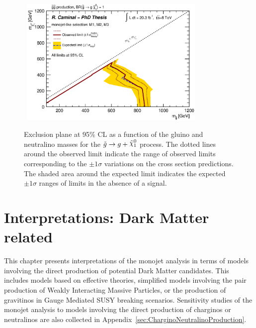 \begin{figure}[!ht]
  \begin{center}
    \mbox{
      \includegraphics[width=0.795\textwidth]{Interpretations/Figures/limitPlotGluinoGg_Stop_combined_M1_M2_M3_.eps}
    }
  \end{center}
  \caption[Exclusion plane at 95\% CL for gluino pair production with $\gluinotog$ as a function of the $m_{\gluino}$ and $m_{\ninoone}$]{Exclusion plane at 95\% CL as a function of the gluino and neutralino masses for the $\gluinotog$ process. The dotted lines around the observed limit indicate the range of observed limits corresponding to the $\pm 1 \sigma$ variations on the cross section predictions. The shaded area around the expected limit indicates the expected $\pm 1 \sigma$ ranges of limits in the absence of a signal.}
  \label{fig:ExclusionGluinoGg}
\end{figure}








\cleardoublepage
\chapter{Interpretations: Dark Matter related}

This chapter presents interpretations of the monojet analysis in terms of models involving the direct production of potential Dark Matter candidates.
This includes models based on effective theories, simplified models involving the pair production of Weakly Interacting Massive Particles, or the production of gravitinos in Gauge Mediated SUSY breaking scenarios.
Sensitivity studies of the monojet analysis to models involving the direct production of charginos or neutralinos are also collected in Appendix~\ref{sec:CharginoNeutralinoProduction}.

